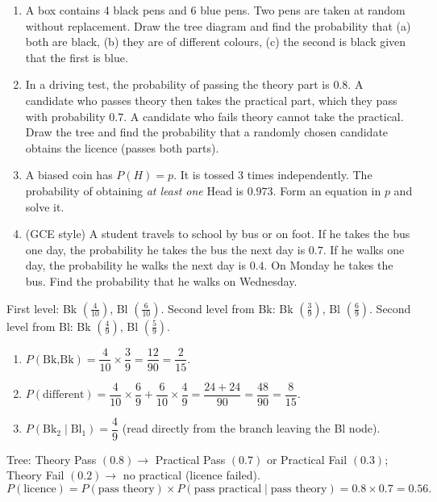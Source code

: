 \documentclass[11pt]{article}
\begin{document}
\begin{exercice}
\begin{enumerate}
    \item A box contains 4 black pens and 6 blue pens. Two pens are taken at random without replacement. Draw the tree diagram and find the probability that (a) both are black, (b) they are of different colours, (c) the second is black given that the first is blue.
    \item In a driving test, the probability of passing the theory part is $0.8$. A candidate who passes theory then takes the practical part, which they pass with probability $0.7$. A candidate who fails theory cannot take the practical. Draw the tree and find the probability that a randomly chosen candidate obtains the licence (passes both parts).
    \item A biased coin has $P(H) = p$. It is tossed 3 times independently. The probability of obtaining \emph{at least one} Head is $0.973$. Form an equation in $p$ and solve it.
    \item (GCE style) A student travels to school by bus or on foot. If he takes the bus one day, the probability he takes the bus the next day is $0.7$. If he walks one day, the probability he walks the next day is $0.4$. On Monday he takes the bus. Find the probability that he walks on Wednesday.
\end{enumerate}
\end{exercice}

\begin{corrige}[Exercise 1]
First level: Bk $\left(\frac{4}{10}\right)$, Bl $\left(\frac{6}{10}\right)$.
Second level from Bk: Bk $\left(\frac{3}{9}\right)$, Bl $\left(\frac{6}{9}\right)$.
Second level from Bl: Bk $\left(\frac{4}{9}\right)$, Bl $\left(\frac{5}{9}\right)$.
\begin{enumerate}
    \item[(a)] $P(\text{Bk,Bk}) = \dfrac{4}{10}\times\dfrac{3}{9} = \dfrac{12}{90} = \dfrac{2}{15}$.
    \item[(b)] $P(\text{different}) = \dfrac{4}{10}\times\dfrac{6}{9} + \dfrac{6}{10}\times\dfrac{4}{9} = \dfrac{24+24}{90} = \dfrac{48}{90} = \dfrac{8}{15}$.
    \item[(c)] $P(\text{Bk}_2 \mid \text{Bl}_1) = \dfrac{4}{9}$ (read directly from the branch leaving the Bl node).
\end{enumerate}
\end{corrige}

\begin{corrige}[Exercise 2]
Tree: Theory Pass $(0.8) \to$ Practical Pass $(0.7)$ or Practical Fail $(0.3)$; Theory Fail $(0.2) \to$ no practical (licence failed).
\[ P(\text{licence}) = P(\text{pass theory}) \times P(\text{pass practical} \mid \text{pass theory}) = 0.8 \times 0.7 = \mathbf{0.56}. \]
\end{corrige}
\end{document}
